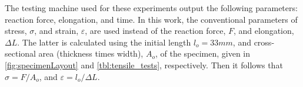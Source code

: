 
The testing machine used for these experiments output the following parameters: reaction force, elongation, and time. In this work, the conventional parameters of stress, $\sigma$, and strain, $\varepsilon$, are used instead of the reaction force, $F$, and elongation, $\Delta L$. The latter is calculated using the initial length $l_o=33 mm$, and cross-sectional area (thickness times width), $A_o$, of the specimen, given in \autoref{fig:specimenLayout} and \autoref{tbl:tensile_tests}, respectively. Then it follows that $\sigma=F/A_o$, and $\varepsilon=l_o/\Delta L$.

